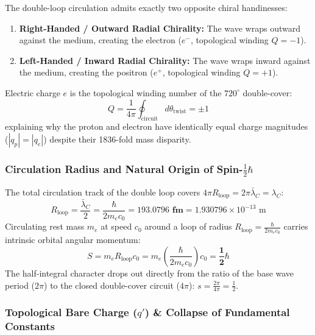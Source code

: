 \documentclass[11pt,a4paper]{article}
\begin{document}
The double-loop circulation admits exactly two opposite chiral handinesses:
\begin{enumerate}
    \item \textbf{Right-Handed / Outward Radial Chirality:} The wave wraps outward against the medium, creating the electron ($e^-$, topological winding $Q = -1$).
    \item \textbf{Left-Handed / Inward Radial Chirality:} The wave wraps inward against the medium, creating the positron ($e^+$, topological winding $Q = +1$).
\end{enumerate}
Electric charge $e$ is the topological winding number of the $720^\circ$ double-cover:
\begin{equation}
Q = \frac{1}{4\pi}\oint_{\text{circuit}} d\theta_{\text{twist}} = \pm 1
\end{equation}
explaining why the proton and electron have identically equal charge magnitudes ($|q_p| = |q_e|$) despite their 1836-fold mass disparity.

\subsubsection{Circulation Radius and Natural Origin of Spin-$\frac{1}{2}\hbar$}
\label{subsubsec:spin_half}

The total circulation track of the double loop covers $4\pi R_{\text{loop}} = 2\pi \bar{\lambda}_C = \lambda_C$:
\begin{equation}
\boxed{R_{\text{loop}} = \frac{\bar{\lambda}_C}{2} = \frac{\hbar}{2 m_e c_0} = \mathbf{193.0796\text{ fm}} = 1.930796 \times 10^{-13}\text{ m}}
\end{equation}
Circulating rest mass $m_e$ at speed $c_0$ around a loop of radius $R_{\text{loop}} = \frac{\hbar}{2 m_e c_0}$ carries intrinsic orbital angular momentum:
\begin{equation}
\boxed{S = m_e R_{\text{loop}} c_0 = m_e \left(\frac{\hbar}{2 m_e c_0}\right) c_0 = \mathbf{\frac{1}{2}\hbar}}
\end{equation}
The half-integral character drops out directly from the ratio of the base wave period ($2\pi$) to the closed double-cover circuit ($4\pi$): $s = \frac{2\pi}{4\pi} = \frac{1}{2}$.

\subsubsection{Topological Bare Charge ($q'$) \& Collapse of Fundamental Constants}
\label{subsubsec:bare_charge}
\end{document}
